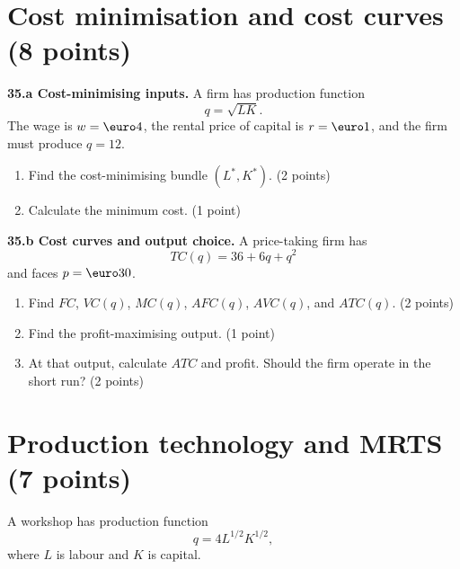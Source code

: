 \documentclass[11pt,a4paper]{article}
\begin{document}
\begin{center}
\end{center}

\newpage
\section{Cost minimisation and cost curves \hfill (8 points)}

\textbf{35.a Cost-minimising inputs.} A firm has production function
\[
q=\sqrt{LK}.
\]
The wage is \(w=\text{\euro}4\), the rental price of capital is
\(r=\text{\euro}1\), and the firm must produce \(q=12\).

\begin{enumerate}[label=(\roman*)]
  \item Find the cost-minimising bundle \((L^*,K^*)\). \hfill (2 points)
  \item Calculate the minimum cost. \hfill (1 point)
\end{enumerate}

\textbf{35.b Cost curves and output choice.} A price-taking firm has
\[
TC(q)=36+6q+q^2
\]
and faces \(p=\text{\euro}30\).

\begin{enumerate}[label=(\roman*)]
  \item Find \(FC\), \(VC(q)\), \(MC(q)\), \(AFC(q)\), \(AVC(q)\), and
        \(ATC(q)\). \hfill (2 points)
  \item Find the profit-maximising output. \hfill (1 point)
  \item At that output, calculate \(ATC\) and profit. Should the firm operate
        in the short run? \hfill (2 points)
\end{enumerate}

\newpage
\section{Production technology and MRTS \hfill (7 points)}

A workshop has production function
\[
q=4L^{1/2}K^{1/2},
\]
where \(L\) is labour and \(K\) is capital.
\end{document}
